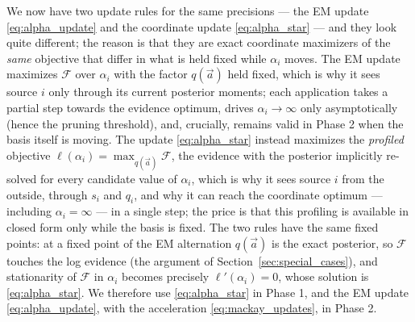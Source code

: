 \documentclass{article}
\begin{document}
We now have two update rules for the same precisions --- the EM update \eqref{eq:alpha_update} and the coordinate update \eqref{eq:alpha_star} --- and they look quite different; the reason is that they are exact coordinate maximizers of the \emph{same} objective that differ in what is held fixed while $\alpha_i$ moves. The EM update maximizes $\mathcal F$ over $\alpha_i$ with the factor $q(\vec a)$ held fixed, which is why it sees source $i$ only through its current posterior moments; each application takes a partial step towards the evidence optimum, drives $\alpha_i \to \infty$ only asymptotically (hence the pruning threshold), and, crucially, remains valid in Phase 2 when the basis itself is moving. The update \eqref{eq:alpha_star} instead maximizes the \emph{profiled} objective $\ell(\alpha_i) = \max_{q(\vec a)} \mathcal F$, the evidence with the posterior implicitly re-solved for every candidate value of $\alpha_i$, which is why it sees source $i$ from the outside, through $s_i$ and $q_i$, and why it can reach the coordinate optimum --- including $\alpha_i = \infty$ --- in a single step; the price is that this profiling is available in closed form only while the basis is fixed. The two rules have the same fixed points: at a fixed point of the EM alternation $q(\vec a)$ is the exact posterior, so $\mathcal F$ touches the log evidence (the argument of Section~\ref{sec:special_cases}), and stationarity of $\mathcal F$ in $\alpha_i$ becomes precisely $\ell'(\alpha_i) = 0$, whose solution is \eqref{eq:alpha_star}. We therefore use \eqref{eq:alpha_star} in Phase 1, and the EM update \eqref{eq:alpha_update}, with the acceleration \eqref{eq:mackay_updates}, in Phase 2.
\end{document}
